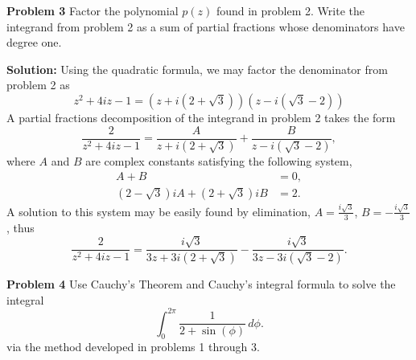 \documentclass[12pt,oneside]{exam}
\newenvironment{exercise}[1]{\vspace{.1in}\noindent\textbf{Problem #1 \hspace{.05em}}}{}
\begin{document}
\vspace{1cm}

\begin{exercise}{3}
Factor the polynomial $p(z)$ found in problem 2. Write the integrand from problem 2 as a sum of partial fractions whose denominators have degree one. 
\end{exercise}

\vspace{0.5cm}

\noindent \textbf{Solution:} Using the quadratic formula, we may factor the denominator from problem 2 as 
\begin{equation*}
z^2+4iz-1 = (z+i(2+\sqrt{3}))(z-i(\sqrt{3}-2))
\end{equation*}
A partial fractions decomposition of the integrand in problem 2 takes the form
\begin{equation*}
\frac{2}{z^2+4iz-1} = \frac{A}{z+i(2+\sqrt{3})} + \frac{B}{z-i(\sqrt{3}-2)},
\end{equation*}
where $A$ and $B$ are complex constants satisfying the following system, 
\begin{align*}
A+ B & = 0,\\
(2-\sqrt{3})iA + (2+\sqrt{3})iB & = 2.
\end{align*}
A solution to this system may be easily found by elimination, $A=\frac{i\sqrt{3}}{3}$, $B=-\frac{i\sqrt{3}}{3}$, thus
\begin{equation*}
\frac{2}{z^2+4iz-1} = \frac{i\sqrt{3}}{3z+3i(2+\sqrt{3})} - \frac{i\sqrt{3}}{3z-3i(\sqrt{3}-2)}.
\end{equation*}

\vspace{1cm}

\begin{exercise}{4}
Use Cauchy's Theorem and Cauchy's integral formula to solve the integral 
\begin{equation*}
\int_{0}^{2\pi} \frac{1}{2+\sin(\phi)}\, d\phi.
\end{equation*}
via the method developed in problems 1 through 3. 
\end{exercise}

\vspace{0.5cm}
\end{document}
